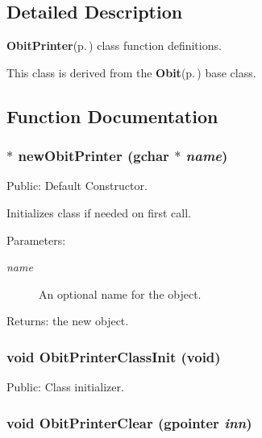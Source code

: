 \subsection{Detailed Description}
{\bf Obit\-Printer}{\rm (p.\,\pageref{structObitPrinter})} class function definitions. 

This class is derived from the {\bf Obit}{\rm (p.\,\pageref{structObit})} base class.

\subsection{Function Documentation}
\subsubsection{$\ast$ new\-Obit\-Printer (gchar $\ast$ {\em name})}\label{ObitPrinter_8c_a6}


Public: Default Constructor. 

Initializes class if needed on first call. \begin{Desc}
\item[Parameters:]
\begin{description}
\item[{\em name}]An optional name for the object. \end{description}
\end{Desc}
\begin{Desc}
\item[Returns:]the new object. \end{Desc}
\subsubsection{\setlength{\rightskip}{0pt plus 5cm}void Obit\-Printer\-Class\-Init (void)}\label{ObitPrinter_8c_a16}


Public: Class initializer. 

\subsubsection{\setlength{\rightskip}{0pt plus 5cm}void Obit\-Printer\-Clear (gpointer {\em inn})}\label{ObitPrinter_8c_a4}



